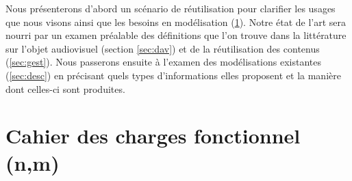 Nous présenterons d'abord un scénario de réutilisation pour clarifier les usages que nous visons ainsi que les besoins en modélisation (\ref{sec:cdc-av}).
Notre état de l'art sera nourri par un examen préalable des définitions que l'on trouve dans la littérature sur l'objet audiovisuel (section \ref{sec:dav}) et de la réutilisation des contenus (\ref{sec:gest}).
Nous passerons ensuite à l'examen des modélisations existantes (\ref{sec:desc}) en précisant quels types d'informations elles proposent et la manière dont celles-ci sont produites. 






\section{Cahier des charges fonctionnel (n,m)}\label{sec:cdc-av}

